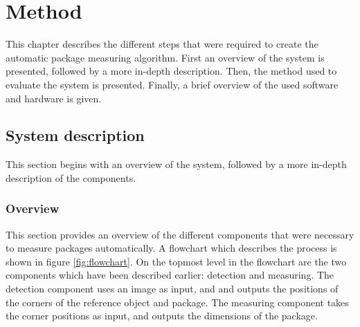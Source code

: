 \chapter{Method}
This chapter describes the different steps that were required to create the automatic package measuring algorithm.
First an overview of the system is presented, followed by a more in-depth description.
Then, the method used to evaluate the system is presented.
Finally, a brief overview of the used software and hardware is given.

\section{System description} \label{method:implementation}
This section begins with an overview of the system, followed by a more in-depth description of the components.

\subsection{Overview}
This section provides an overview of the different components that were necessary to measure packages automatically.
A flowchart which describes the process is shown in figure \ref{fig:flowchart}.
On the topmost level in the flowchart are the two components which have been described earlier: detection and measuring. 
The detection component uses an image as input, and and outputs the positions of the corners of the reference object and package.
The measuring component takes the corner positions as input, and outputs the dimensions of the package.

